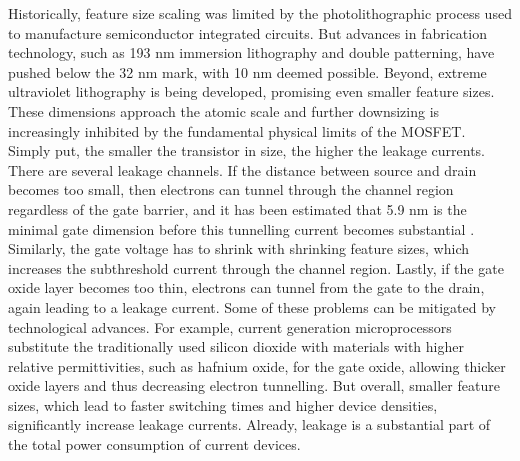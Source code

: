 Historically, feature size scaling was limited by the photolithographic process
used to manufacture semiconductor integrated circuits. But advances in
fabrication technology, such as 193 nm immersion lithography and double
patterning, have pushed below the 32 nm mark, with 10 nm deemed possible.
Beyond, extreme ultraviolet lithography is being developed, promising even
smaller feature sizes. These dimensions approach the atomic scale and further
downsizing is increasingly inhibited by the fundamental physical limits of the
MOSFET. Simply put, the smaller the transistor in size, the higher the leakage
currents. There are several leakage channels. If the distance between source and
drain becomes too small, then electrons can tunnel through the channel region
regardless of the gate barrier, and it has been estimated that 5.9 nm is the
minimal gate dimension before this tunnelling current becomes substantial
\cite{cavin2012science}. Similarly, the gate voltage has to shrink with
shrinking feature sizes, which increases the subthreshold current through the
channel region. Lastly, if the gate oxide layer becomes too thin, electrons can
tunnel from the gate to the drain, again leading to a leakage current. Some of
these problems can be mitigated by technological advances. For example, current
generation microprocessors substitute the traditionally used silicon dioxide
with materials with higher relative permittivities, such as hafnium oxide, for
the gate oxide, allowing thicker oxide layers and thus decreasing electron
tunnelling. But overall, smaller feature sizes, which lead to faster switching
times and higher device densities, significantly increase leakage currents.
Already, leakage is a substantial part of the total power consumption of current
devices.

